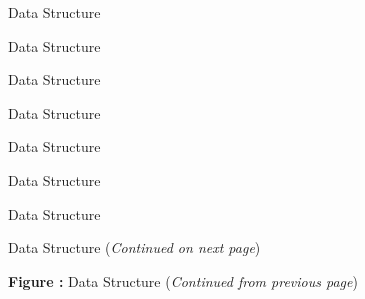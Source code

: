 \clearpage
\begin{figure}[!htp]
\centering

\caption{ Data Structure}
\label{f:ThermalConductivityModel}
\end{figure}

\clearpage
\begin{figure}[!htp]
\centering

\caption{ Data Structure}
\label{f:ThermalRelaxationModel}
\end{figure}

\clearpage
\begin{figure}[!htp]
\centering

\caption{ Data Structure}
\label{f:TurbulenceClosure}
\end{figure}

\clearpage
\begin{figure}[!htp]
\centering

\caption{ Data Structure}
\label{f:TurbulenceModel}
\end{figure}

\clearpage
\begin{figure}[!htp]
\centering
\resizebox{\linewidth}{!}{}
%
\caption{ Data Structure}
\label{f:UserDefinedData}
\end{figure}

\clearpage
\begin{figure}[!htp]
\centering

\caption{ Data Structure}
\label{f:ViscosityModel}
\end{figure}

\clearpage
\begin{figure}[!htp]
\centering

\caption{ Data Structure}
\label{f:WallFunction}
\end{figure}

\clearpage
\begin{figure}[!htp]
\centering
\resizebox{\linewidth}{!}{}
\caption[ Data Structure]{ Data Structure (\textit{Continued on next page})}
\label{f:Zone}
\end{figure}
\clearpage
\begin{figure}[!htp]
\centering
\resizebox{\linewidth}{!}{}
\par\vspace{\abovecaptionskip}
\textbf{Figure :}  Data Structure (\textit{Continued from previous page})
\end{figure}

